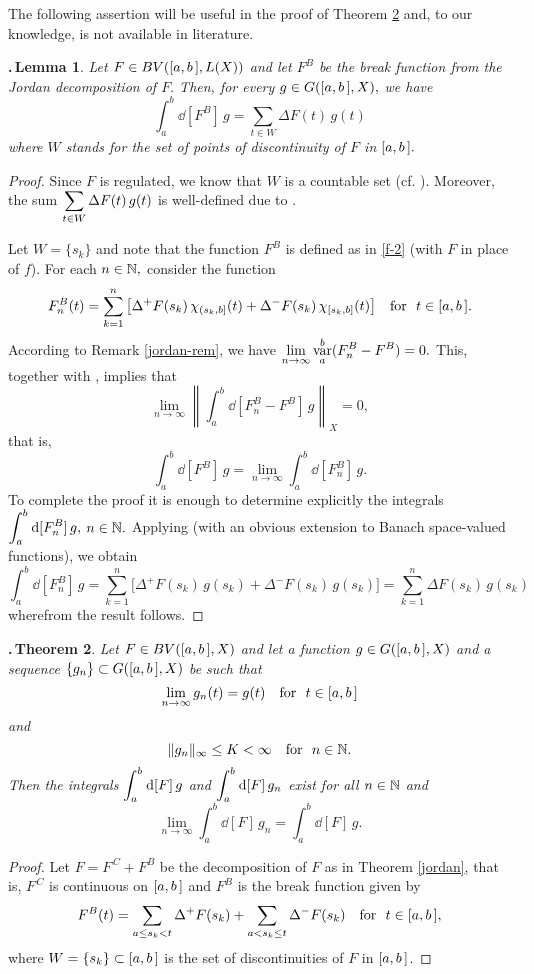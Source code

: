 \documentclass[12pt,twoside]{article}
\numberwithin{equation}{section}
\theoremstyle{plain}
\newtheorem{theorem}{\hskip-1mm.\,Theorem}[section]
\newtheorem{lemma}[theorem]{\hskip-1mm.\,Lemma}
\theoremstyle{definition}
\DeclareMathOperator{\var}{var}
\begin{document}
{\smallskip

The following assertion will be useful in the proof of Theorem \ref{Osgood} and, to our
knowledge, is not available in literature.

\smallskip

\begin{lemma}\label{break-lim}
Let $F\in BV([a,b\,], L(X))$ and let $F^B$ be the break function from the Jordan
decomposition of $F.$ Then, for every $g\in G([a,b\,],X),$ we have
\[
   \int_a^b\dd[F^B]\,g=\sum_{t\in W}\Delta F(t)\,g(t)
\]
where $W$ stands for the set of points of discontinuity of $F$ in $[a,b\,].$
\end{lemma}
\begin{proof}
Since $F$ is regulated, we know that $W$ is a countable set (cf. \cite[Corollary I.3.2]{H}).
Moreover, the sum $\displaystyle\sum_{t\in W}\Delta F(t)\,g(t)$ is well-defined due
to \cite[Lemma 4.1]{MT1}.

Let $W=\{s_k\}$ and note that the function $F^B$ is defined as in \eqref{f-2} (with $F$
in place of $f$). For each $n\in{\mathbb N},$ consider the function
\[
   F_n^B(t)=\sum_{k=1}^n\big[\Delta^+F(s_k)\,\chi_{(s_k,b]}(t)
                            +\Delta^-F(s_k)\,\chi_{[s_k,b]}(t)\big]
   \quad\mbox{for \ } t\in[a,b\,].
\]
According to Remark \ref{jordan-rem}, we have $\dis\lim_{n\to\infty}\var_a^b(F_n^B-F^B)=0.$
This, together with \cite[Proposition 10]{Sch1}, implies that
\[
    \lim_{n\to\infty}\left\|\int_a^b\dd[F_n^B-F^B]\,g\right\|_X=0,
\]
that is,
\[
    \int_a^b\dd[F^B]\,g=\lim_{n\to\infty}\int_a^b\dd[F_n^B]\,g.
\]
To complete the proof it is enough to determine explicitly the integrals
$\displaystyle\int_a^b\hskip0.2mm\mbox{\rm d}[F_n^B]\,g,$ $n\in{\mathbb N}.$  Applying \cite[Proposition 2.3.3]{T1}
(with an obvious extension to Banach space-valued functions), we obtain
\[
   \int_a^b\dd[F_n^B]\,g
   =\sum_{k=1}^n\big[\Delta^+F(s_k)\,g(s_k)+\Delta^-F(s_k)\,g(s_k)\big]
   =\sum_{k=1}^n\Delta F(s_k)\,g(s_k)
\]
wherefrom the result follows.
\end{proof}

\smallskip

\begin{theorem}\label{Osgood}
Let $F\in BV([a,b\,],X)$ and let a function $g\in G([a,b\,],X)$ and a sequence $\{g_n\}\subset G([a,b\,],X)$
be such that
\[
   \lim_{n\to\infty}g_n(t)=g(t)\quad \mbox{for \ }t\in\ab
\]
and
\[
   \|g_n\|_\infty\le K<\infty\quad\mbox{for \ }n\in{\mathbb N}.
\]
Then the integrals $\displaystyle\int_a^b\hskip0.2mm\mbox{\rm d}[F]\,g$ and $\displaystyle\int_a^b\hskip0.2mm\mbox{\rm d}[F]\,g_n$ exist for all
$n\in{\mathbb N}$ and
\begin{equation}\label{convergence}
   \lim_{n\to\infty}\int_a^b\dd[F]\,g_n=\int_a^b\dd[F]\,g.
\end{equation}
\end{theorem}
\begin{proof} Let $F=F^{\,C}+F^B$ be the decomposition of $F$ as in Theorem \ref{jordan},
that is, $F^{\,C}$ is continuous on $[a,b\,]$ and $F^B$ is the break function given by
\[
   F^B(t)=\sum_{a\leq s_k<t}\Delta^+F(s_k)+\sum_{a<s_k\leq t}\Delta^-F(s_k)
   \quad\mbox{for \ } t\in[a,b\,],
\]
where $W=\{s_k\}\subset[a,b\,]$ is the set of discontinuities of $F$ in $[a,b\,]$.


\end{proof}}
\end{document}

